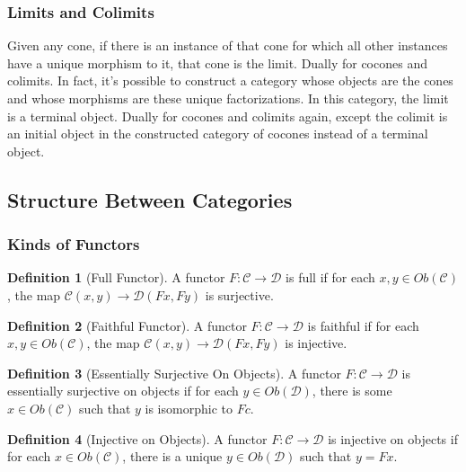 \documentclass{article}
\theoremstyle{definition}
\newtheorem{definition}{Definition}
\begin{document}
\subsubsection*{Limits and Colimits}
Given any cone, if there is an instance of that cone for which all other instances have a unique morphism to it, that cone is the limit.
Dually for cocones and colimits.
In fact, it's possible to construct a category whose objects are the cones and whose morphisms are these unique factorizations.
In this category, the limit is a terminal object.
Dually for cocones and colimits again, except the colimit is an initial object in the constructed category of cocones instead of a terminal object.


\subsection*{Structure Between Categories}

\subsubsection*{Kinds of Functors}

\begin{definition}[Full Functor]
    A functor $F:\mathcal{C}\rightarrow\mathcal{D}$ is full if for each $x,y\in Ob(\mathcal{C})$, the map $\mathcal{C}(x, y)\rightarrow\mathcal{D}(Fx,Fy)$ is surjective.
\end{definition}

\begin{definition}[Faithful Functor]
    A functor $F:\mathcal{C}\rightarrow\mathcal{D}$ is faithful if for each $x,y\in Ob(\mathcal{C})$, the map $\mathcal{C}(x, y)\rightarrow\mathcal{D}(Fx,Fy)$ is injective.
\end{definition}

\begin{definition}[Essentially Surjective On Objects]
    A functor $F:\mathcal{C}\rightarrow\mathcal{D}$ is essentially surjective on objects if for each $y\in Ob(\mathcal{D})$, there is some $x\in Ob(\mathcal{C})$ such that $y$ is isomorphic to $Fc$.
\end{definition}

\begin{definition}[Injective on Objects]
    A functor $F:\mathcal{C}\rightarrow\mathcal{D}$ is injective on objects if for each $x\in Ob(\mathcal{C})$, there is a unique $y\in Ob(\mathcal{D})$ such that $y=Fx$.
\end{definition}
\end{document}
